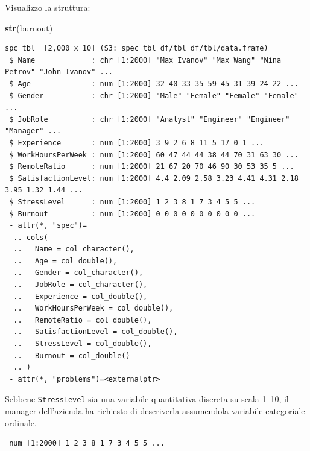 \documentclass[
  ignorenonframetext,
  compress, aspectratio=149]{beamer}
\newenvironment{Shaded}{\begin{snugshade}}{\end{snugshade}}
\newcommand{\FunctionTok}[1]{\textcolor[rgb]{0.13,0.29,0.53}{\textbf{#1}}}
\newcommand{\NormalTok}[1]{#1}
\newcommand{\SpecialCharTok}[1]{\textcolor[rgb]{0.81,0.36,0.00}{\textbf{#1}}}
\begin{document}
\begin{frame}[fragile]
Visualizzo la struttura:

\begin{Shaded}
\begin{Highlighting}[]
\FunctionTok{str}\NormalTok{(burnout)}
\end{Highlighting}
\end{Shaded}

\begin{verbatim}
spc_tbl_ [2,000 x 10] (S3: spec_tbl_df/tbl_df/tbl/data.frame)
 $ Name             : chr [1:2000] "Max Ivanov" "Max Wang" "Nina Petrov" "John Ivanov" ...
 $ Age              : num [1:2000] 32 40 33 35 59 45 31 39 24 22 ...
 $ Gender           : chr [1:2000] "Male" "Female" "Female" "Female" ...
 $ JobRole          : chr [1:2000] "Analyst" "Engineer" "Engineer" "Manager" ...
 $ Experience       : num [1:2000] 3 9 2 6 8 11 5 17 0 1 ...
 $ WorkHoursPerWeek : num [1:2000] 60 47 44 44 38 44 70 31 63 30 ...
 $ RemoteRatio      : num [1:2000] 21 67 20 70 46 90 30 53 35 5 ...
 $ SatisfactionLevel: num [1:2000] 4.4 2.09 2.58 3.23 4.41 4.31 2.18 3.95 1.32 1.44 ...
 $ StressLevel      : num [1:2000] 1 2 3 8 1 7 3 4 5 5 ...
 $ Burnout          : num [1:2000] 0 0 0 0 0 0 0 0 0 0 ...
 - attr(*, "spec")=
  .. cols(
  ..   Name = col_character(),
  ..   Age = col_double(),
  ..   Gender = col_character(),
  ..   JobRole = col_character(),
  ..   Experience = col_double(),
  ..   WorkHoursPerWeek = col_double(),
  ..   RemoteRatio = col_double(),
  ..   SatisfactionLevel = col_double(),
  ..   StressLevel = col_double(),
  ..   Burnout = col_double()
  .. )
 - attr(*, "problems")=<externalptr> 
\end{verbatim}
\end{frame}

\begin{frame}[fragile]
Sebbene \texttt{StressLevel} sia una variabile quantitativa discreta su
scala 1--10, il manager dell'azienda ha richiesto di descriverla
assumendola variabile categoriale ordinale.

\begin{Shaded}
\end{Shaded}

\begin{verbatim}
 num [1:2000] 1 2 3 8 1 7 3 4 5 5 ...
\end{verbatim}
\end{frame}
\end{document}
